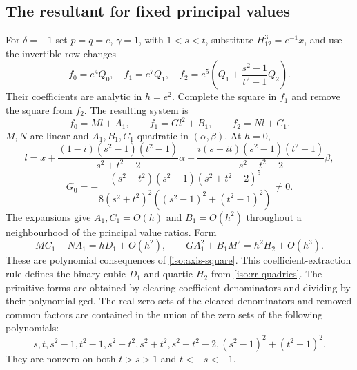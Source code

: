 \documentclass[11pt,a4paper]{article}
\numberwithin{equation}{section}
\theoremstyle{plain}
\theoremstyle{definition}
\theoremstyle{remark}
\begin{document}
\subsection{The resultant for fixed principal values}\label{appiso-material}

For $\delta=+1$ set $p=q=e$, $\gamma=1$, with $1<s<t$, substitute $H_{12}^3=e^{-1}x$,
and use the invertible row changes
\[
 f_0=e^4Q_0,\quad f_1=e^7Q_1,\quad
 f_2=e^5\left(Q_1+\frac{s^2-1}{t^2-1}Q_2\right).
\]
Their coefficients are analytic in $h=e^2$.  Complete the square in $f_1$
and remove the square from $f_2$. The resulting system is
\begin{equation}\label{iso:axis-square}
 f_0=Ml+A_1,\qquad f_1=Gl^2+B_1,\qquad f_2=Nl+C_1.
\end{equation}
$M,N$ are linear and $A_1,B_1,C_1$ quadratic in $(\alpha,\beta)$.  At $h=0$,
\[
 l=x+\frac{(1-i)(s^2-1)(t^2-1)}{s^2+t^2-2}\alpha
      +\frac{i(s+it)(s^2-1)(t^2-1)}{s^2+t^2-2}\beta ,
\]
\[
 G_0=-\frac{(s^2-t^2)(s^2-1)(s^2+t^2-2)^5}
 {8(s^2+t^2)^2((s^2-1)^2+(t^2-1)^2)}\ne0.
\]
The expansions give $A_1,C_1=O(h)$ and $B_1=O(h^2)$ throughout
a neighbourhood of the principal value ratios.  Form
\[
 MC_1-NA_1=hD_1+O(h^2),\qquad
 GA_1^2+B_1M^2=h^2H_2+O(h^3).
\]
These are polynomial consequences of \eqref{iso:axis-square}.
This coefficient-extraction rule defines the binary cubic $D_1$ and
quartic $H_2$ from \eqref{iso:rr-quadrics}.
The primitive forms are obtained by clearing coefficient denominators and
dividing by their polynomial gcd. The real zero sets of the cleared
denominators and removed common factors are contained in the union of
the zero sets of the following polynomials:
\[
 s,t,s^2-1,t^2-1,s^2-t^2,s^2+t^2,s^2+t^2-2,
 (s^2-1)^2+(t^2-1)^2.
\]
They are nonzero on both $t>s>1$ and $t<-s<-1$.
\end{document}
